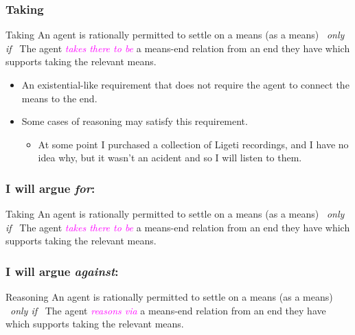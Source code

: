 \documentclass[noamssymb, compress, handout]{beamer} %
\begin{document}
  \begin{frame}
    \frametitle{Taking}

  \begin{block}{Taking}
    An agent is rationally permitted to settle on a means (as a means)
    \newline
    \mbox{ }\hfill\emph{only if}\hfill\mbox{ }
    \newline
    The agent \textcolor{fuchsia}{\emph{takes there to be}} a means-end relation from an end they have which supports taking the relevant means.
  \end{block}

  \begin{itemize}
  \item An existential-like requirement that does not require the agent to connect the means to the end.
  \item Some cases of reasoning may satisfy this requirement.
    \begin{itemize}
    \item At some point I purchased a collection of Ligeti recordings, and I have no idea why, but it wasn't an acident and so I will listen to them.
    \end{itemize}
  \end{itemize}
\end{frame}

\begin{frame}
  \frametitle{I will argue \emph{for}:}

  \begin{block}{Taking}
    An agent is rationally permitted to settle on a means (as a means)
    \newline
    \mbox{ }\hfill\emph{only if}\hfill\mbox{ }
    \newline
    The agent \textcolor{fuchsia}{\emph{takes there to be}} a means-end relation from an end they have which supports taking the relevant means.
  \end{block}
\end{frame}


\begin{frame}
  \frametitle{I will argue \emph{against}:}

  \begin{block}{Reasoning}
    An agent is rationally permitted to settle on a means (as a means)
    \newline
    \mbox{ }\hfill\emph{only if}\hfill\mbox{ }
    \newline
    The agent \textcolor{fuchsia}{\emph{reasons via}} a means-end relation from an end they have which supports taking the relevant means.
  \end{block}
\end{frame}
\end{document}
